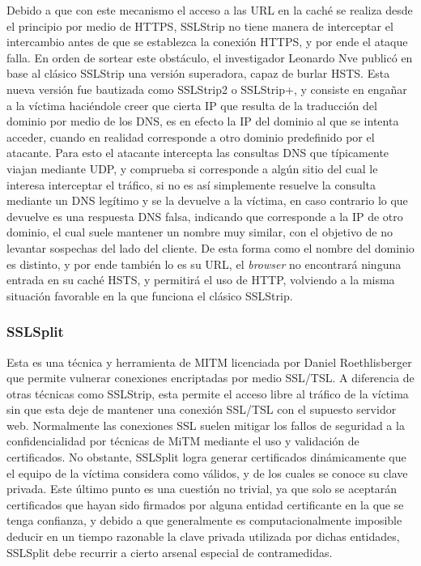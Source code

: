 \documentclass[10pt,a4paper]{article}
\begin{document}
Debido a que con este mecanismo el acceso a las URL en la caché se realiza desde el principio por medio de HTTPS, SSLStrip no tiene manera de interceptar el intercambio antes de que se establezca la conexión HTTPS, y por ende el ataque falla. En orden de sortear este obstáculo, el investigador Leonardo Nve publicó en base al clásico SSLStrip una versión superadora, capaz de burlar HSTS. Esta nueva versión fue bautizada como SSLStrip2 o SSLStrip+, y consiste en engañar a la víctima haciéndole creer que cierta IP que resulta de la traducción del dominio por medio de los DNS, es en efecto la IP del dominio al que se intenta acceder, cuando en realidad corresponde a otro dominio predefinido por el atacante. Para esto el atacante intercepta las consultas DNS que típicamente viajan mediante UDP, y comprueba si corresponde a algún sitio del cual le interesa interceptar el tráfico, si no es así simplemente resuelve la consulta mediante un DNS legítimo y se la devuelve a la víctima, en caso contrario lo que devuelve es una respuesta DNS falsa, indicando que corresponde a la IP de otro dominio, el cual suele mantener un nombre muy similar, con el objetivo de no levantar sospechas del lado del cliente. De esta forma como el nombre del dominio es distinto, y por ende también lo es su URL, el \textit{browser} no encontrará ninguna entrada en su caché HSTS, y permitirá el uso de HTTP, volviendo a la misma situación favorable en la que funciona el clásico SSLStrip.

\subsubsection{SSLSplit}

Esta es una técnica y herramienta de MITM licenciada por Daniel Roethlisberger que permite vulnerar conexiones encriptadas por medio SSL/TSL. A diferencia de otras técnicas como SSLStrip, esta permite el acceso libre al tráfico de la víctima sin que esta deje de mantener una conexión SSL/TSL con el supuesto servidor web. Normalmente las conexiones SSL suelen mitigar los fallos de seguridad a la confidencialidad por técnicas de MiTM mediante el uso y validación de certificados. No obstante, SSLSplit logra generar certificados dinámicamente que el equipo de la víctima considera como válidos, y de los cuales se conoce su clave privada. Este último punto es una cuestión no trivial, ya que solo se aceptarán certificados que hayan sido firmados por alguna entidad certificante en la que se tenga confianza, y debido a que generalmente es computacionalmente imposible deducir en un tiempo razonable la clave privada utilizada por dichas entidades, SSLSplit debe recurrir a cierto arsenal especial de contramedidas.
\end{document}
